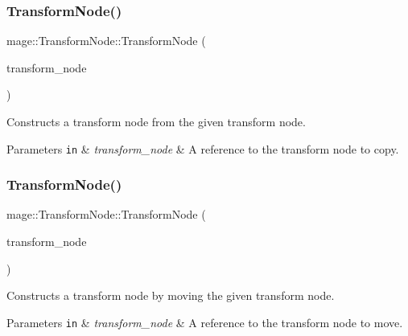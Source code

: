 \subsubsection{\texorpdfstring{Transform\+Node()}{TransformNode()}\hspace{0.1cm}{\footnotesize\ttfamily [2/3]}}
{\footnotesize\ttfamily mage\+::\+Transform\+Node\+::\+Transform\+Node (\begin{DoxyParamCaption}\item[{const \hyperlink{classmage_1_1_transform_node}{Transform\+Node} \&}]{transform\+\_\+node }\end{DoxyParamCaption})\hspace{0.3cm}{\ttfamily [private]}}

Constructs a transform node from the given transform node.


\begin{DoxyParams}[1]{Parameters}
\mbox{\tt in}  & {\em transform\+\_\+node} & A reference to the transform node to copy. \\
\hline
\end{DoxyParams}
\hypertarget{classmage_1_1_transform_node_ae9e2e7dafab6af1e4a400fa0b84eff35}{}\label{classmage_1_1_transform_node_ae9e2e7dafab6af1e4a400fa0b84eff35} 
\subsubsection{\texorpdfstring{Transform\+Node()}{TransformNode()}\hspace{0.1cm}{\footnotesize\ttfamily [3/3]}}
{\footnotesize\ttfamily mage\+::\+Transform\+Node\+::\+Transform\+Node (\begin{DoxyParamCaption}\item[{\hyperlink{classmage_1_1_transform_node}{Transform\+Node} \&\&}]{transform\+\_\+node }\end{DoxyParamCaption})\hspace{0.3cm}{\ttfamily [private]}}

Constructs a transform node by moving the given transform node.


\begin{DoxyParams}[1]{Parameters}
\mbox{\tt in}  & {\em transform\+\_\+node} & A reference to the transform node to move. \\
\hline
\end{DoxyParams}


